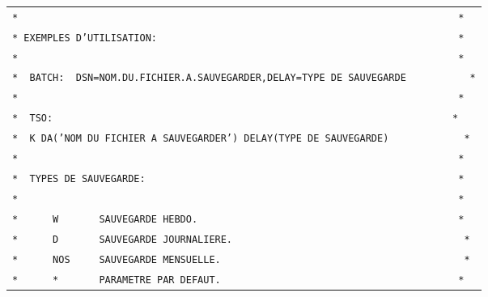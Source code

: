 \begin{tabular}{@{}l@{}}
\texttt{*\ \ \ \ \ \ \ \ \ \ \ \ \ \ \ \ \ \ \ \ \ \ \ \ \ \ \ \ \ \ \ \ \ \ \ \ \ \ \ \ \ \ \ \ \ \ \ \ \ \ \ \ \ \ \ \ \ \ \ \ \ \ \ \ \ \ \ \ \ \ \ \ \ \ \ \ *}\\
\texttt{*\ EXEMPLES\ D'UTILISATION:\ \ \ \ \ \ \ \ \ \ \ \ \ \ \ \ \ \ \ \ \ \ \ \ \ \ \ \ \ \ \ \ \ \ \ \ \ \ \ \ \ \ \ \ \ \ \ \ \ \ \ \ *}\\
\texttt{*\ \ \ \ \ \ \ \ \ \ \ \ \ \ \ \ \ \ \ \ \ \ \ \ \ \ \ \ \ \ \ \ \ \ \ \ \ \ \ \ \ \ \ \ \ \ \ \ \ \ \ \ \ \ \ \ \ \ \ \ \ \ \ \ \ \ \ \ \ \ \ \ \ \ \ \ *}\\
\texttt{*\ \ BATCH:\ \ DSN=NOM.DU.FICHIER.A.SAUVEGARDER,DELAY=TYPE\ DE\ SAUVEGARDE\ \ \ \ \ \ \ \ \ \ \ *}\\
\texttt{*\ \ \ \ \ \ \ \ \ \ \ \ \ \ \ \ \ \ \ \ \ \ \ \ \ \ \ \ \ \ \ \ \ \ \ \ \ \ \ \ \ \ \ \ \ \ \ \ \ \ \ \ \ \ \ \ \ \ \ \ \ \ \ \ \ \ \ \ \ \ \ \ \ \ \ \ *}\\
\texttt{*\ \ TSO:\ \ \ \ \ \ \ \ \ \ \ \ \ \ \ \ \ \ \ \ \ \ \ \ \ \ \ \ \ \ \ \ \ \ \ \ \ \ \ \ \ \ \ \ \ \ \ \ \ \ \ \ \ \ \ \ \ \ \ \ \ \ \ \ \ \ \ \ \ *}\\
\texttt{*\ \ K\ DA('NOM\ DU\ FICHIER\ A\ SAUVEGARDER')\ DELAY(TYPE\ DE\ SAUVEGARDE)\ \ \ \ \ \ \ \ \ \ \ \ \ *}\\
\texttt{*\ \ \ \ \ \ \ \ \ \ \ \ \ \ \ \ \ \ \ \ \ \ \ \ \ \ \ \ \ \ \ \ \ \ \ \ \ \ \ \ \ \ \ \ \ \ \ \ \ \ \ \ \ \ \ \ \ \ \ \ \ \ \ \ \ \ \ \ \ \ \ \ \ \ \ \ *}\\
\texttt{*\ \ TYPES\ DE\ SAUVEGARDE:\ \ \ \ \ \ \ \ \ \ \ \ \ \ \ \ \ \ \ \ \ \ \ \ \ \ \ \ \ \ \ \ \ \ \ \ \ \ \ \ \ \ \ \ \ \ \ \ \ \ \ \ \ \ *}\\
\texttt{*\ \ \ \ \ \ \ \ \ \ \ \ \ \ \ \ \ \ \ \ \ \ \ \ \ \ \ \ \ \ \ \ \ \ \ \ \ \ \ \ \ \ \ \ \ \ \ \ \ \ \ \ \ \ \ \ \ \ \ \ \ \ \ \ \ \ \ \ \ \ \ \ \ \ \ \ *}\\
\texttt{*\ \ \ \ \ \ W\ \ \ \ \ \ \ SAUVEGARDE\ HEBDO.\ \ \ \ \ \ \ \ \ \ \ \ \ \ \ \ \ \ \ \ \ \ \ \ \ \ \ \ \ \ \ \ \ \ \ \ \ \ \ \ \ \ \ \ \ *}\\
\texttt{*\ \ \ \ \ \ D\ \ \ \ \ \ \ SAUVEGARDE\ JOURNALIERE.\ \ \ \ \ \ \ \ \ \ \ \ \ \ \ \ \ \ \ \ \ \ \ \ \ \ \ \ \ \ \ \ \ \ \ \ \ \ \ \ *}\\
\texttt{*\ \ \ \ \ \ NOS\ \ \ \ \ SAUVEGARDE\ MENSUELLE.\ \ \ \ \ \ \ \ \ \ \ \ \ \ \ \ \ \ \ \ \ \ \ \ \ \ \ \ \ \ \ \ \ \ \ \ \ \ \ \ \ \ *}\\
\texttt{*\ \ \ \ \ \ *\ \ \ \ \ \ \ PARAMETRE\ PAR\ DEFAUT.\ \ \ \ \ \ \ \ \ \ \ \ \ \ \ \ \ \ \ \ \ \ \ \ \ \ \ \ \ \ \ \ \ \ \ \ \ \ \ \ \ *}\\

\end{tabular}
